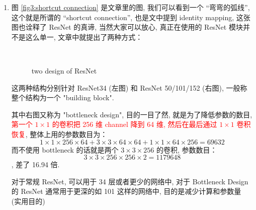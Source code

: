 \documentclass[12pt]{ctexart}%
\begin{document}
\begin{enumerate}
				\item 图 \ref{fig3:shortcut connection} 是文章里的图, 我们可以看到一个 “弯弯的弧线”, 这个就是所谓的 “shortcut connection”, 也是文中提到 identity mapping, 这张图也诠释了 ResNet 的真谛, 当然大家可以放心, 真正在使用的 ResNet 模块并不是这么单一, 文章中就提出了两种方式：
					\begin{figure}[H]
						\vspace{-0.3cm}  %
						\setlength{\abovecaptionskip}{-0.05cm}   %
						\centering
						\qquad
						\renewcommand{\figurename}{Fig} %
						\caption{two design of ResNet}
						\label{fig4:build block}
					\end{figure}
				这两种结构分别针对 ResNet34 (左图) 和 ResNet 50/101/152 (右图), 一般称整个结构为一个 "building block". 
				
				其中右图又称为 "bottleneck design", 目的一目了然, 就是为了降低参数的数目, \textcolor{red}{第一个 $1\times 1$ 的卷积把 256 维 channel 降到 64 维, 然后在最后通过 $1 \times 1$ 卷积恢复}, 整体上用的参数数目为：
					$$1 \times 1 \times 256 \times 64 + 3\times 3\times 64 \times 64 + 1 \times 1 \times 64\times 256 = 69632$$
				而不使用 bottleneck 的话就是两个 $3 \times 3 \times 256$ 的卷积, 参数数目：
					$$3 \times 3 \times 256 \times 256 \times 2 = 1179648$$
				, 差了 16.94 倍.
				
				对于常规 ResNet, 可以用于 34 层或者更少的网络中, 对于 Bottleneck Design 的 ResNet 通常用于更深的如 101 这样的网络中, 目的是减少计算和参数量 (实用目的)
			\end{enumerate}
			
\end{document}
